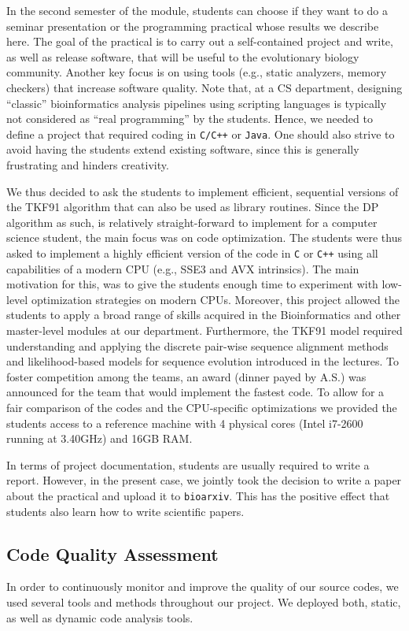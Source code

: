 \documentclass[runningheads,a4paper]{llncs}
\begin{document}
In the second semester of the module, students can choose if they want to do a seminar presentation or the programming practical whose results we describe here.
The goal of the practical is to carry out a self-contained project and write, as well as release software, that will be useful to the evolutionary biology community.
Another key focus is on using tools (e.g., static analyzers, memory checkers) that increase software quality.
Note that, at a CS department, designing ``classic'' bioinformatics analysis pipelines using scripting languages is typically not considered as ``real programming'' by the
students. Hence, we needed to define a project that required coding in \texttt{C/C++} or \texttt{Java}.
One should also strive to avoid having the students extend existing software, since
this is generally frustrating and hinders creativity.

We thus decided to ask the students to implement efficient, sequential versions of the TKF91 algorithm that can also be used as library routines. 
Since the DP algorithm as such, is relatively straight-forward to implement for a computer science student, the main focus was on code optimization. 
The students were thus asked to implement a highly efficient version of the code in \texttt{C} or \texttt{C++} using all capabilities of a modern CPU (e.g., SSE3 and AVX intrinsics).
The main motivation for this, was to give the students enough time to experiment with low-level optimization strategies on modern CPUs. 
Moreover, this project allowed the students to apply a broad range of skills acquired in the Bioinformatics and other master-level modules at our department.
Furthermore, the TKF91 model required understanding and applying the discrete pair-wise sequence alignment methods and likelihood-based models for sequence evolution
introduced in the lectures. 
To foster competition among the teams, an award (dinner payed by A.S.) was announced for the team that would implement the fastest code. 
To allow for a fair comparison of the codes and the CPU-specific optimizations we provided the students access to a reference machine with 
4 physical cores (Intel i7-2600 running at 3.40GHz) and 16GB RAM. 

In terms of project documentation, students are usually required to write a report. However, in the present case, we jointly took the decision to write a paper 
about the practical and upload it to \texttt{bioarxiv}. This has the positive effect that students also learn how to write scientific papers.

\subsection{Code Quality Assessment}
In order to continuously monitor and improve the quality of our source codes, we used several tools and methods throughout our project.
We deployed both, static, as well as dynamic code analysis tools.
\end{document}
